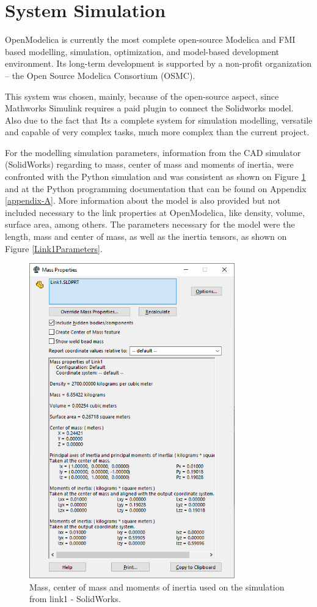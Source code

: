 \documentclass[transmag]{IEEEtran}
\begin{document}
\clearpage
\newpage


\section{System Simulation}

OpenModelica is currently the most complete open-source Modelica and FMI based modelling, simulation, optimization, and model-based development environment. Its long-term development is supported by a non-profit organization – the Open Source Modelica Consortium (OSMC). \cite{ref2}

This system was chosen, mainly, because of the open-source aspect, since Mathworks Simulink requires a paid plugin to connect the Solidworks model. Also due to the fact that Its a complete system for simulation modelling, versatile and capable of very complex tasks, much more complex than the current project.

For the modelling simulation parameters, information from the CAD simulator (SolidWorks) regarding to mass, center of mass and moments of inertia, were confronted with the Python simulation and was consistent as shown on Figure \ref{MassProperties} and at the Python programming documentation that can be found on Appendix \ref{appendix-A}. More information about the model is also provided but not included necessary to the link properties at OpenModelica, like density, volume, surface area, among others. The parameters necessary for the model were the length, mass and center of mass, as well as the inertia tensors, as shown on Figure \ref{Link1Parameters}. 



\begin{figure}
\centerline{\includegraphics[width=3.5in]{./images/MassProperties}}
\caption{Mass, center of mass and moments of inertia used on the simulation from link1 - SolidWorks.\label{MassProperties}}
\end{figure}
\end{document}
